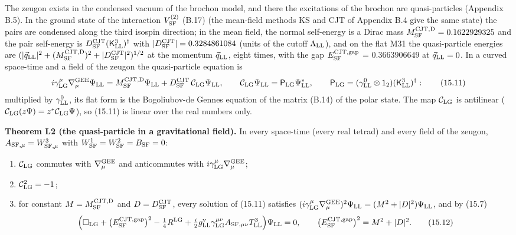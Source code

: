 \documentclass[
  10pt,
]{article}
\begin{document}
The zeugon exists in the condensed vacuum of the brochon model, and
there the excitations of the brochon are quasi-particles (Appendix B.5).
In the ground state of the interaction \(V^{(2)}_{\rm SF}\) (B.17) (the
mean-field methods KS and CJT of Appendix B.4 give the same state) the
pairs are condensed along the third isospin direction; in the mean
field, the normal self-energy is a Dirac mass
\(M^{\rm CJT,D}_{\rm SF}=0.1622929325\) and the pair self-energy is
\(D^{\rm CJT}_{\rm SF}(\mathsf K^3_{\rm LL})^\dagger\) with
\(\lvert D^{\rm CJT}_{\rm SF}\rvert=0.3284861084\) (units of the cutoff
\(\Lambda_{\rm LL}\)), and on the flat M31 the quasi-particle energies
are
\((\lvert\vec q_{\rm LL}\rvert^2+(M^{\rm CJT,D}_{\rm SF})^2+\lvert D^{\rm CJT}_{\rm SF}\rvert^2)^{1/2}\)
at the momentum \(\vec q_{\rm LL}\), eight times, with the gap
\(E^{\rm CJT,gap}_{\rm SF}\) = \(0.3663906649\) at
\(\vec q_{\rm LL}=0\). In a curved space-time and a field of the zeugon
the quasi-particle equation is
\[i\gamma^\mu_{\rm LG}\nabla^{\rm GEE}_\mu\Psi_{\rm LL}=M^{\rm CJT,D}_{\rm SF}\Psi_{\rm LL}+D^{\rm CJT}_{\rm SF}\,\mathcal C_{\rm LG}\Psi_{\rm LL},\qquad\mathcal C_{\rm LG}\Psi_{\rm LL}=\mathsf P_{\rm LG}\Psi^*_{\rm LL},\qquad\mathsf P_{\rm LG}=(\gamma^0_{\rm LL}\otimes\mathsf 1_2)(\mathsf K^3_{\rm LL})^\dagger:\tag{15.11}\]
multiplied by \(\gamma^0_{\rm LL}\), its flat form is the Bogoliubov-de
Gennes equation of the matrix (B.14) of the polar state. The map
\(\mathcal C_{\rm LG}\) is antilinear
(\(\mathcal C_{\rm LG}(z\Psi)=z^*\mathcal C_{\rm LG}\Psi\)), so (15.11)
is linear over the real numbers only.

\textbf{Theorem L2 (the quasi-particle in a gravitational field).} In
every space-time (every real tetrad) and every field of the zeugon,
\(A_{{\rm SF},\mu}=W^3_{{\rm SF},\mu}\) with
\(W^1_{\rm SF}=W^2_{\rm SF}=B_{\rm SF}=0\):

\begin{enumerate}
\def\labelenumi{(\alph{enumi})}
\item
  \(\mathcal C_{\rm LG}\) commutes with \(\nabla^{\rm GEE}_\mu\) and
  anticommutes with \(i\gamma^\mu_{\rm LG}\nabla^{\rm GEE}_\mu\);
\item
  \(\mathcal C_{\rm LG}^2=-1\);
\item
  for constant \(M=M^{\rm CJT,D}_{\rm SF}\) and
  \(D=D^{\rm CJT}_{\rm SF}\), every solution of (15.11) satisfies
  \((i\gamma^\mu_{\rm LG}\nabla^{\rm GEE}_\mu)^2\Psi_{\rm LL}=(M^2+\lvert D\rvert^2)\Psi_{\rm LL}\),
  and by (15.7)
  \[\Big(\Box_{\rm LG}+\big(E^{\rm CJT,gap}_{\rm SF}\big)^2-\tfrac14R^{\rm LG}+\tfrac i2g^{\rm v}_{\rm LL}\gamma^{\mu\nu}_{\rm LG}A_{{\rm SF},\mu\nu}T^3_{\rm LL}\Big)\Psi_{\rm LL}=0,\qquad\big(E^{\rm CJT,gap}_{\rm SF}\big)^2=M^2+\lvert D\rvert^2.\tag{15.12}\]
\end{enumerate}
\end{document}
